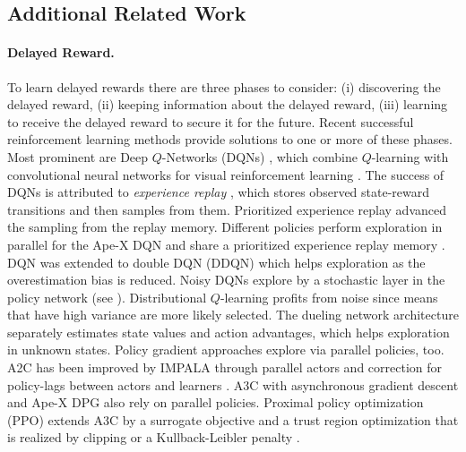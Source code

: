 \documentclass{article}
\begin{document}
\begin{appendices}
\clearpage
\pagebreak
\section{Additional Related Work}

\paragraph{Delayed Reward.}

To learn delayed rewards there are three phases to consider:
(i) discovering the delayed reward,
(ii) keeping information about the delayed reward,
(iii) learning to receive the delayed reward to secure it for the future.
Recent successful reinforcement learning methods provide solutions to one
or more of these phases.
Most prominent are
Deep $Q$-Networks (DQNs) \cite{Mnih:13,Mnih:15}, which
combine $Q$-learning with convolutional neural networks for 
visual reinforcement learning \cite{Koutnik:13}.
The success of DQNs is attributed to
{\em experience replay} \cite{Lin:93}, which stores
observed state-reward transitions and then samples from them.
Prioritized experience replay \cite{Schaul:15,Horgan:18} advanced the
sampling from the replay memory.
Different policies perform exploration in parallel for the Ape-X DQN 
and share a prioritized experience replay memory \cite{Horgan:18}.
DQN was extended to double DQN (DDQN) \cite{Hasselt:10,Hasselt:16}
which helps exploration as the overestimation bias is reduced.
Noisy DQNs \cite{Fortunato:18} explore by
a stochastic layer in the policy network (see \cite{Hochreiter:90,Schmidhuber:90diff}).
Distributional $Q$-learning \cite{Bellemare:17} profits from noise since means that
have high variance are more likely selected.
The dueling network architecture \cite{Wang:15,Wang:16} separately
estimates state values and action advantages,
which helps exploration in unknown states.
Policy gradient approaches \cite{Williams:92} explore via parallel
policies, too. 
A2C has been improved by IMPALA through parallel actors and
correction for policy-lags between actors and learners \cite{Espeholt:18}.
A3C with asynchronous gradient descent \cite{Mnih:16}
and  Ape-X DPG \cite{Horgan:18} also rely on parallel policies.
Proximal policy optimization (PPO) extends A3C by a surrogate
objective and a trust region optimization that is realized by clipping or
a Kullback-Leibler penalty \cite{Schulman:17}.


\end{appendices}
\end{document}
